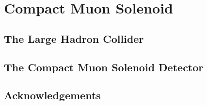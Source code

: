 \chapter{Compact Muon Solenoid}

\section{The Large Hadron Collider} \label{sec:lhc}


\section{The Compact Muon Solenoid Detector} \label{sec:cms}


\section{Acknowledgements} \label{sec:cms_ack}

